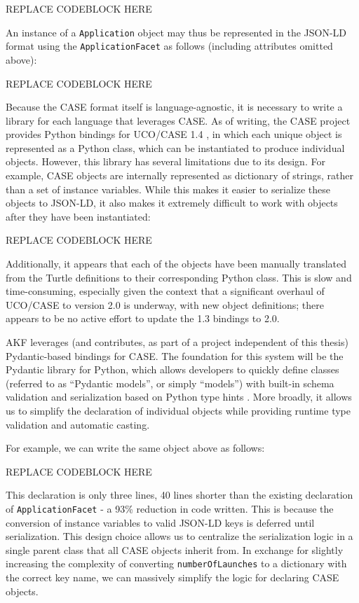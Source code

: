 \documentclass[letterpaper,12pt]{report}
\begin{document}
REPLACE CODEBLOCK HERE

An instance of a \texttt{Application} object may thus be represented in
the JSON-LD format using the \texttt{ApplicationFacet} as follows
(including attributes omitted above):

REPLACE CODEBLOCK HERE

Because the CASE format itself is language-agnostic, it is necessary to
write a library for each language that leverages CASE. As of writing,
the CASE project provides Python bindings for UCO/CASE 1.4
\cite{CaseworkCASEMappingPython}, in which each unique object is
represented as a Python class, which can be instantiated to produce
individual objects. However, this library has several limitations due to
its design. For example, CASE objects are internally represented as
dictionary of strings, rather than a set of instance variables. While
this makes it easier to serialize these objects to JSON-LD, it also
makes it extremely difficult to work with objects after they have been
instantiated:

REPLACE CODEBLOCK HERE

Additionally, it appears that each of the objects have been manually
translated from the Turtle definitions to their corresponding Python
class. This is slow and time-consuming, especially given the context
that a significant overhaul of UCO/CASE to version 2.0 is underway, with
new object definitions; there appears to be no active effort to update
the 1.3 bindings to 2.0.

AKF leverages (and contributes, as part of a project independent of this
thesis) Pydantic-based bindings for CASE. The foundation for this system
will be the Pydantic library for Python, which allows developers to
quickly define classes (referred to as ``Pydantic models'', or simply
``models'') with built-in schema validation and serialization based on
Python type hints \cite{colvinPydantic2024}. More broadly, it allows
us to simplify the declaration of individual objects while providing
runtime type validation and automatic casting.

For example, we can write the same object above as follows:

REPLACE CODEBLOCK HERE

This declaration is only three lines, 40 lines shorter than the existing
declaration of \texttt{ApplicationFacet} - a 93\% reduction in code
written. This is because the conversion of instance variables to valid
JSON-LD keys is deferred until serialization. This design choice allows
us to centralize the serialization logic in a single parent class that
all CASE objects inherit from. In exchange for slightly increasing the
complexity of converting \texttt{numberOfLaunches} to a dictionary with
the correct key name, we can massively simplify the logic for declaring
CASE objects.
\end{document}
